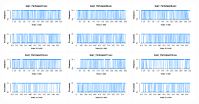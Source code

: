 \begin{figure}[th]
\includegraphics[width=0.30\textwidth]{Figures/Response_Exp1_P7} \includegraphics[width=0.30\textwidth]{Figures/Response_Exp1_P8} \includegraphics[width=0.30\textwidth]{Figures/Response_Exp1_P9}
\includegraphics[width=0.30\textwidth]{Figures/Response_Exp1_P10} \includegraphics[width=0.30\textwidth]{Figures/Response_Exp1_P11} \includegraphics[width=0.30\textwidth]{Figures/Response_Exp1_P12}

\end{figure}
